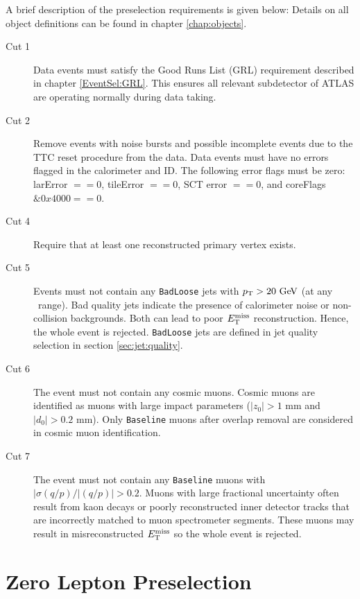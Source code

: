 \indent A brief description of the preselection requirements is given below: Details on all object definitions can be found in chapter \ref{chap:objects}. \\

\begin{description}
\item[Cut 1] Data events must satisfy the Good Runs List (GRL) requirement described in chapter \ref{EventSel:GRL}.  This ensures all relevant subdetector of ATLAS are operating normally during data taking. 
\item[Cut 2] Remove events with noise bursts and possible incomplete events due to the TTC reset procedure from the data. Data events must have no errors flagged in the calorimeter and ID.  The following error flags must be zero: larError $== 0$, tileError $== 0$, SCT error $==0$, and coreFlags $\&0x4000 == 0$.
\item[Cut 4] Require that at least one reconstructed primary vertex exists.
\item[Cut 5] Events must not contain any {\tt BadLoose} jets with $\pT > 20 \gev$ (at any \eta\ range). Bad quality jets indicate the presence of calorimeter noise or non-collision backgrounds. Both can lead to poor $E_{\mathrm{T}}^{\mathrm{miss}}$ reconstruction. Hence, the whole event is rejected.  {\tt BadLoose} jets are defined in jet quality selection in section \ref{sec:jet:quality}.  
\item[Cut 6] The event must not contain any cosmic muons.  Cosmic muons are identified as muons with large impact parameters  ($|z_0| > 1$ mm and $|d_0| > 0.2$ mm).  Only {\tt Baseline} muons after overlap removal are considered in cosmic muon identification.
\item[Cut 7] The event must not contain any {\tt Baseline} muons with $|\sigma(q/p)/|(q/p)| > 0.2$.  Muons with large fractional uncertainty often result from kaon decays or poorly reconstructed inner detector tracks that are incorrectly matched to muon spectrometer segments. These muons may result in misreconstructed $E_{\mathrm{T}}^{\mathrm{miss}}$ so the whole event is rejected.
\end{description}


\section{Zero Lepton Preselection}

